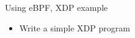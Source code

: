 \setuplabframe
{Using eBPF, XDP example}
{
  \begin{itemize}
  \item Write a simple XDP program
  \end{itemize}
}
